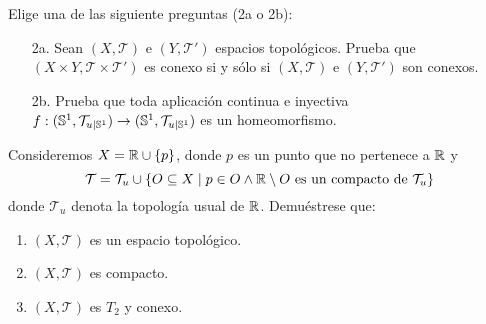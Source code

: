 \documentclass[12pt]{article}
\newcommand{\resetearcontador}{%
  \setcounter{ejercicio}{0} %
}
\begin{document}
    \begin{ejercicio}[2.5 puntos]
        Elige una de las siguiente preguntas (2a o 2b):
        \begin{enumerate}
            \item[2a.] Sean $(X, \mathcal{T})$ e $(Y, \mathcal{T}')$ espacios topológicos. Prueba que $(X\times Y, \mathcal{T}\times \mathcal{T}')$ es conexo si y sólo si $(X, \mathcal{T})$ e $(Y, \mathcal{T}')$ son conexos.
            \item[2b.] Prueba que toda aplicación continua e inyectiva $f:(\mathbb{S}^1, \mathcal{T}_{u|\mathbb{S}^1}) \rightarrow (\mathbb{S}^1, \mathcal{T}_{u|\mathbb{S}^1})$ es un homeomorfismo.
        \end{enumerate}
    \end{ejercicio}


    \begin{ejercicio}[3 puntos]
        Consideremos $X = \mathbb{R} \cup \{p\}$, donde $p$ es un punto que no pertenece a $\mathbb{R}$ y 
        $$\mathcal{T} = \mathcal{T}_u \cup \{O \subseteq X \mid p \in O \land \mathbb{R}\setminus O \mbox{ es un compacto de } \mathcal{T}_u\}$$
        donde $\mathcal{T}_u$ denota la topología usual de $\mathbb{R}$. Demuéstrese que:
        \begin{enumerate}[label=(\alph*)]
            \item $(X,\mathcal{T})$ es un espacio topológico.
            \item $(X,\mathcal{T})$ es compacto.
            \item $(X,\mathcal{T})$ es $T_2$ y conexo.
        \end{enumerate}
    \end{ejercicio}
    
    \newpage
    \           %
    \newpage
    \resetearcontador
\end{document}
